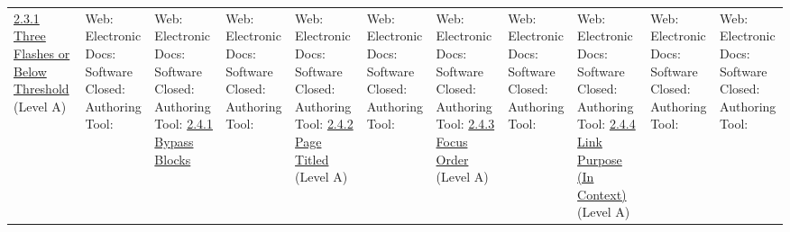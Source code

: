 \documentclass[a4paper]{report}
\begin{document}
\begin{longtable}{|l|l|l|}
 	\hline
 	\href{http://www.w3.org/TR/WCAG20/#seizure-does-not-violate}{2.3.1 Three Flashes or Below Threshold} (Level A) & \makecell{Web: \\ Electronic Docs: \\ Software \\ Closed: \\ Authoring Tool:} & \makecell{Web: \\ Electronic Docs: \\ Software \\ Closed: \\ Authoring Tool:}
 	\hline
 	\href{http://www.w3.org/TR/WCAG20/#navigation-mechanisms-skip}{2.4.1 Bypass Blocks} & \makecell{Web: \\ Electronic Docs: \\ Software \\ Closed: \\ Authoring Tool:} & \makecell{Web: \\ Electronic Docs: \\ Software \\ Closed: \\ Authoring Tool:}
 	\hline
 	\href{http://www.w3.org/TR/WCAG20/#navigation-mechanisms-title}{2.4.2 Page Titled} (Level A) & \makecell{Web: \\ Electronic Docs: \\ Software \\ Closed: \\ Authoring Tool:} & \makecell{Web: \\ Electronic Docs: \\ Software \\ Closed: \\ Authoring Tool:}
 	\hline
 	\href{http://www.w3.org/TR/WCAG20/#navigation-mechanisms-focus-order}{2.4.3 Focus Order} (Level A) & \makecell{Web: \\ Electronic Docs: \\ Software \\ Closed: \\ Authoring Tool:} & \makecell{Web: \\ Electronic Docs: \\ Software \\ Closed: \\ Authoring Tool:}
 	\hline
 	\href{http://www.w3.org/TR/WCAG20/#navigation-mechanisms-refs}{2.4.4 Link Purpose (In Context)} (Level A) & \makecell{Web: \\ Electronic Docs: \\ Software \\ Closed: \\ Authoring Tool:} & \makecell{Web: \\ Electronic Docs: \\ Software \\ Closed: \\ Authoring Tool:}

\end{longtable}
\end{document}

